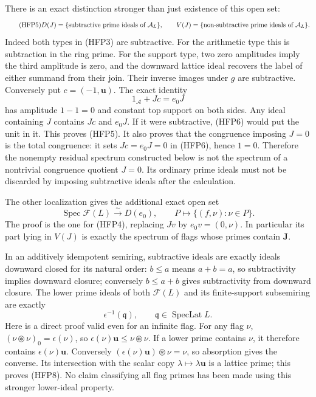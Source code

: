 There is an exact distinction stronger than just existence of this
open set:
\begin{equation}\tag{HFP5}
 D(J)=\{\hbox{subtractive prime ideals of }\mathcal A_L\},
 \qquad V(J)=\{\hbox{non-subtractive prime ideals of }\mathcal A_L\}.
\end{equation}
Indeed both types in (HFP3) are subtractive. For the arithmetic
type this is subtraction in the ring prime. For the support type,
two zero amplitudes imply the third amplitude is zero, and the
downward lattice ideal recovers the label of either summand from
their join. Their inverse images under $g$ are subtractive.
Conversely put $c=(-1,\mathbf u)$. The exact identity
\begin{equation}\tag{HFP6}
             1_{\mathcal A}+Jc=e_0J
\end{equation}
has amplitude $1-1=0$ and constant top support on both sides.
Any ideal containing $J$ contains $Jc$ and $e_0J$. If it were
subtractive, (HFP6) would put the unit in it. This proves (HFP5).
It also proves that the congruence imposing $J=0$ is the total
congruence: it sets $Jc=e_0J=0$ in (HFP6), hence $1=0$.
Therefore the nonempty residual spectrum constructed below is
not the spectrum of a nontrivial congruence quotient $J=0$.
Its ordinary prime ideals must not be discarded by imposing
subtractive ideals after the calculation.

The other localization gives the additional exact open set
\begin{equation}\tag{HFP7}
 \operatorname{Spec}\mathcal F(L)\xrightarrow{\sim}D(e_0),
 \qquad P\longmapsto\{(f,\nu):\nu\in P\}.
\end{equation}
The proof is the one for (HFP4), replacing $Jv$ by $e_0v=(0,\nu)$.
In particular its part lying in $V(J)$ is exactly the spectrum
of flags whose primes contain $\mathbf J$.

In an additively idempotent semiring, subtractive ideals are exactly
ideals downward closed for its natural order: $b\le a$ means
$a+b=a$, so subtractivity implies downward closure; conversely
$b\le a+b$ gives subtractivity from downward closure.
The lower prime ideals of both $\mathcal F(L)$ and its finite-support
subsemiring are exactly
\begin{equation}\tag{HFP8}
 \epsilon^{-1}(\mathfrak q),\qquad
                       \mathfrak q\in\operatorname{SpecLat}L.
\end{equation}
Here is a direct proof valid even for an infinite flag. For any
flag $\nu$, $(\nu\circledast\nu)_0=\epsilon(\nu)$, so
$\epsilon(\nu)\mathbf u\le\nu\circledast\nu$. If a lower
prime contains $\nu$, it therefore contains
$\epsilon(\nu)\mathbf u$. Conversely
$(\epsilon(\nu)\mathbf u)\circledast\nu=\nu$, so absorption
gives the converse. Its intersection with the scalar copy
$\lambda\mapsto\lambda\mathbf u$ is a lattice prime; this
proves (HFP8). No claim classifying all flag primes has been
made using this stronger lower-ideal property.

